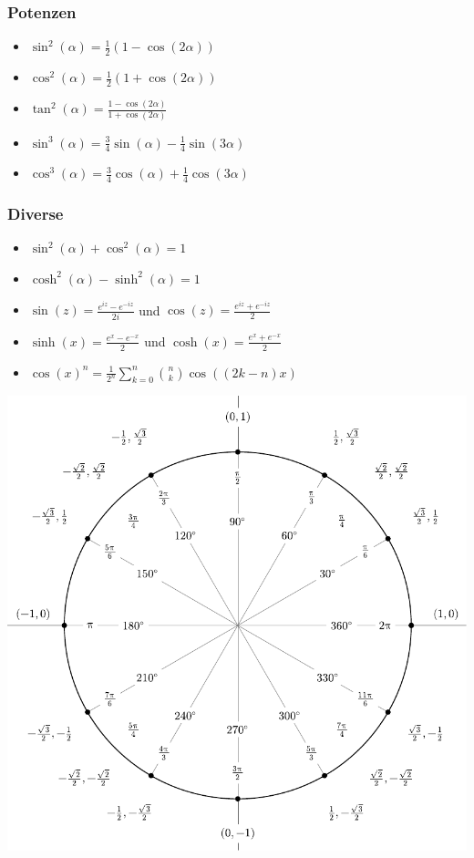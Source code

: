 \documentclass[a4paper,10pt]{article}
\begin{document}
\subsubsection{Potenzen}
\begin{itemize}
	\item $\sin^2(\alpha) = \frac{1}{2}(1-\cos(2\alpha))$
	\item $\cos^2(\alpha) = \frac{1}{2}(1+\cos(2\alpha))$
	\item $\tan^2(\alpha) = \frac{1-\cos(2\alpha)}{1+\cos(2\alpha)}$
	\item $\sin^3(\alpha) = \frac{3}{4} \sin(\alpha) - \frac{1}{4} \sin(3 \alpha)$
	\item $\cos^3(\alpha) = \frac{3}{4} \cos(\alpha) + \frac{1}{4} \cos(3 \alpha)$
\end{itemize}

\subsubsection{Diverse}

\begin{itemize}
	\item $\sin^2(\alpha) + \cos^2(\alpha) = 1$
	\item $\cosh^2(\alpha) - \sinh^2(\alpha) = 1$
	\item $\sin(z) = \frac{e^{iz} - e^{-iz}}{2i}$ und $\cos(z) = \frac{e^{iz} + e^{-iz}}{2}$
	\item $\sinh(x) = \frac{e^x - e^{-x}}{2}$ und $\cosh(x) = \frac{e^x + e^{-x}}{2}$
	\item $\cos(x)^n = \frac{1}{2^n} \sum_{k=0}^n {n \choose k} \cos((2k - n)x)$
\end{itemize}

\begin{center}
	\includegraphics[width=0.7 \linewidth]{include_degrees_circle.pdf}
\end{center}
\end{document}
